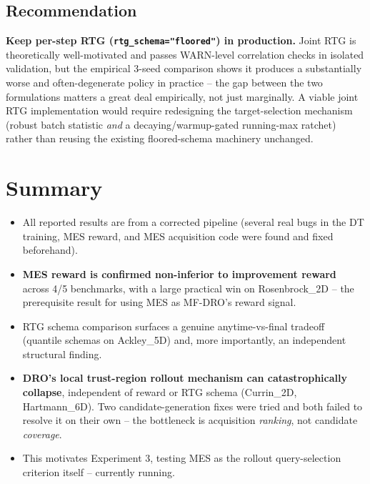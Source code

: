 \documentclass[11pt]{article}
\begin{document}
\subsection{Recommendation}

\textbf{Keep per-step RTG (\texttt{rtg\_schema="floored"}) in production.}
Joint RTG is theoretically well-motivated and passes WARN-level correlation
checks in isolated validation, but the empirical 3-seed comparison shows it
produces a substantially worse and often-degenerate policy in practice --
the gap between the two formulations matters a great deal empirically, not
just marginally. A viable joint RTG implementation would require
redesigning the target-selection mechanism (robust batch statistic \emph{and}
a decaying/warmup-gated running-max ratchet) rather than reusing the
existing floored-schema machinery unchanged.

\FloatBarrier
\section{Summary}

\begin{itemize}[itemsep=3pt]
    \item All reported results are from a corrected pipeline (several real
          bugs in the DT training, MES reward, and MES acquisition code were
          found and fixed beforehand).
    \item \textbf{MES reward is confirmed non-inferior to improvement reward}
          across 4/5 benchmarks, with a large practical win on Rosenbrock\_2D
          -- the prerequisite result for using MES as MF-DRO's reward signal.
    \item RTG schema comparison surfaces a genuine anytime-vs-final tradeoff
          (quantile schemas on Ackley\_5D) and, more importantly, an
          independent structural finding.
    \item \textbf{DRO's local trust-region rollout mechanism can catastrophically
          collapse}, independent of reward or RTG schema (Currin\_2D,
          Hartmann\_6D). Two candidate-generation fixes were tried and both
          failed to resolve it on their own -- the bottleneck is acquisition
          \emph{ranking}, not candidate \emph{coverage}.
    \item This motivates Experiment 3, testing MES as the rollout query-selection
          criterion itself -- currently running.
\end{itemize}
\end{document}
